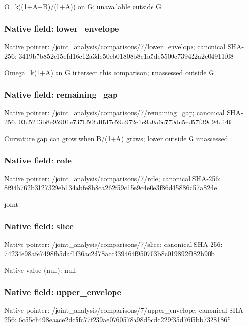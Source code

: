 \documentclass[10pt,a4paper]{article}
\begin{document}
\begingroup\raggedright\sloppy O\_\allowbreak{}k((1+A+B)/\allowbreak{}(1+A)) on G;\allowbreak{} unavailable outside G\par\endgroup

\subsubsection{Native field: lower\_\allowbreak{}envelope}
Native pointer: /joint\_\allowbreak{}analysis/comparisons/7/lower\_\allowbreak{}envelope; canonical SHA-256: 3419b7b852e15efd16c12a3de50eb01808b8c1a5de5500c739422a2c04911f08

\begingroup\raggedright\sloppy Omega\_\allowbreak{}k(1+A) on G intersect this comparison;\allowbreak{} unassessed outside G\par\endgroup

\subsubsection{Native field: remaining\_\allowbreak{}gap}
Native pointer: /joint\_\allowbreak{}analysis/comparisons/7/remaining\_\allowbreak{}gap; canonical SHA-256: 03c5243b8e95901e737b508dffd7c59a972e1e9a0a6c770dc5ed57f39d94c446

\begingroup\raggedright\sloppy Curvature gap can grow when B/\allowbreak{}(1+A) grows;\allowbreak{} lower outside G unassessed.\par\endgroup

\subsubsection{Native field: role}
Native pointer: /joint\_\allowbreak{}analysis/comparisons/7/role; canonical SHA-256: 8f94b762b3127329eb134abfe8b8ca262f59c15e9c4e0e3f86d45886d57a82de

\begingroup\raggedright\sloppy joint\par\endgroup

\subsubsection{Native field: slice}
Native pointer: /joint\_\allowbreak{}analysis/comparisons/7/slice; canonical SHA-256: 74234e98afe7498fb5daf1f36ac2d78acc339464f950703b8c019892f982b90b

Native value (null): null

\subsubsection{Native field: upper\_\allowbreak{}envelope}
Native pointer: /joint\_\allowbreak{}analysis/comparisons/7/upper\_\allowbreak{}envelope; canonical SHA-256: 6c55cb498eaace2dc5fc77f239ae0760578a98d5cdc229f35d76f5bb73281865
\end{document}
